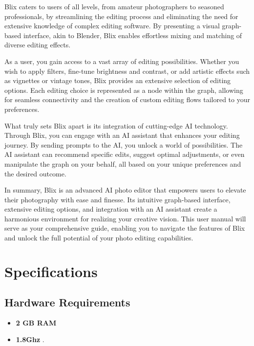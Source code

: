 \documentclass[11pt,a4paper]{article}
\begin{document}
Blix caters to users of all levels, from amateur photographers to seasoned professionals, by streamlining the editing process and eliminating the need 
for extensive knowledge of complex editing software. By presenting a visual graph-based interface, akin to Blender, Blix enables effortless mixing and matching of diverse editing effects.

As a user, you gain access to a vast array of editing possibilities. Whether you wish to apply filters, fine-tune brightness and contrast, or add artistic effects such as vignettes or vintage tones, Blix provides an extensive selection of editing options. Each editing choice is represented as a node within the graph, allowing for seamless connectivity and the creation of custom editing flows tailored to your preferences.

What truly sets Blix apart is its integration of cutting-edge AI technology. Through Blix, you can engage with an AI assistant that enhances your editing journey. 
By sending prompts to the AI, you unlock a world of possibilities. The AI assistant can recommend specific edits, suggest optimal adjustments, or even manipulate the graph on your behalf, 
all based on your unique preferences and the desired outcome.

In summary, Blix is an advanced AI photo editor that empowers users to elevate their photography with ease and finesse. Its intuitive graph-based interface, extensive editing options, 
and integration with an AI assistant create a harmonious environment for realizing your creative vision. This user manual will serve as your comprehensive guide, enabling you 
to navigate the features of Blix and unlock the full potential of your photo editing capabilities.
\pagebreak


\section*{Specifications}

\subsection*{Hardware Requirements}
\begin{itemize}
  \item[\textbullet] \textbf{2 GB RAM}
  \item[\textbullet] \textbf{1.8Ghz }.

\end{itemize}
\end{document}
